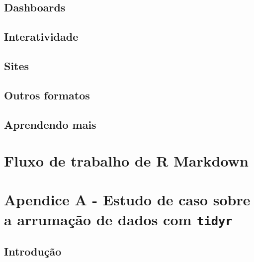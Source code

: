 \documentclass[
]{latex/krantz}
\theoremstyle{definition}
\theoremstyle{definition}
\theoremstyle{definition}
\theoremstyle{definition}
\theoremstyle{remark}
\begin{document}
\hypertarget{dashboards}{%
\section{Dashboards}\label{dashboards}}

\hypertarget{interatividade}{%
\section{Interatividade}\label{interatividade}}

\hypertarget{sites}{%
\section{Sites}\label{sites}}

\hypertarget{outros-formatos}{%
\section{Outros formatos}\label{outros-formatos}}

\hypertarget{aprendendo-mais-3}{%
\section{Aprendendo mais}\label{aprendendo-mais-3}}

\hypertarget{fluxo-de-trabalho-de-r-markdown}{%
\chapter{Fluxo de trabalho de R Markdown}\label{fluxo-de-trabalho-de-r-markdown}}

\hypertarget{appendix-apuxe9ndices}{%
\appendix {}}


\hypertarget{apendice-a---estudo-de-caso-sobre-a-arrumauxe7uxe3o-de-dados-com-tidyr}{%
\chapter{\texorpdfstring{Apendice A - Estudo de caso sobre a arrumação de dados com \texttt{tidyr}}{Apendice A - Estudo de caso sobre a arrumação de dados com tidyr}}\label{apendice-a---estudo-de-caso-sobre-a-arrumauxe7uxe3o-de-dados-com-tidyr}}

\hypertarget{introduuxe7uxe3o-20}{%
\section*{Introdução}\label{introduuxe7uxe3o-20}}
\end{document}
